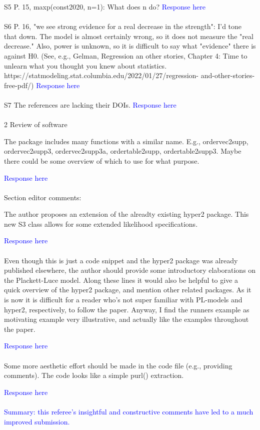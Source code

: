 \documentclass[12pt]{article}
\begin{document}
S5 P. 15, maxp(const2020, n=1): What does n do?
\textcolor{blue}{Response here}\\ \\



S6 P. 16, "we see strong evidence for a real decrease in the strength": I'd tone
that down. The model is almost certainly wrong, so it does not measure
the "real decrease." Also, power is unknown, so it is difficult to say what
"evidence" there is against H0. (See, e.g., Gelman, Regression an other
stories, Chapter 4: Time to unlearn what you thought you knew about
statistics. https://statmodeling.stat.columbia.edu/2022/01/27/regression-
and-other-stories-free-pdf/)
\textcolor{blue}{Response here}\\ \\



S7 The references are lacking their DOIs.
\textcolor{blue}{Response here}\\ \\

2 Review of software

The package includes many functions with a similar name. E.g., ordervec2supp,
ordervec2supp3, ordervec2supp3a, ordertable2supp, ordertable2supp3. Maybe
there could be some overview of which to use for what purpose.

\textcolor{blue}{Response here}\\ \\

Section editor comments:

The author proposes an extension of the alreadty existing hyper2 package.
This new S3 class allows for some extended likelihood specifications.

\textcolor{blue}{Response here}\\ \\


Even though this is just a code snippet and the hyper2 package was already
published elsewhere, the author should provide some introductory elaborations
on the Plackett-Luce model. Along these lines it would also be helpful to give
a quick overview of the hyper2 package, and mention other related packages. As it
is now it is difficult for a reader who's not super familiar with PL-models and
hyper2, respectively, to follow the paper. Anyway, I find the runners example
as motivating example very illustrative, and actually like the examples throughout
the paper.

\textcolor{blue}{Response here}\\ \\

Some more aesthetic effort should be made in the code file (e.g., providing
comments). The code looks like a simple purl() extraction.

\textcolor{blue}{Response here}\\ \\


\textcolor{blue}{Summary: this referee's insightful and
  constructive comments have led to a much improved submission.}
\end{document}
